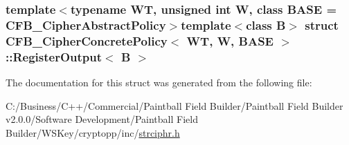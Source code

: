 \subsubsection*{template$<$typename WT, unsigned int W, class BASE = CFB\_\-CipherAbstractPolicy$>$template$<$class B$>$ struct CFB\_\-CipherConcretePolicy$<$ WT, W, BASE $>$::RegisterOutput$<$ B $>$}



The documentation for this struct was generated from the following file:\begin{DoxyCompactItemize}
\item 
C:/Business/C++/Commercial/Paintball Field Builder/Paintball Field Builder v2.0.0/Software Development/Paintball Field Builder/WSKey/cryptopp/inc/\hyperlink{strciphr_8h}{strciphr.h}\end{DoxyCompactItemize}
